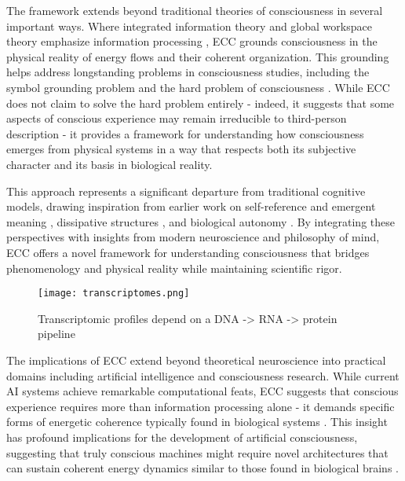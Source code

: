 \begin{refsection}
The framework extends beyond traditional theories of consciousness in several important ways. Where integrated information theory and global workspace theory emphasize information processing \cite{tononi2015consciousness,Baars2019}, ECC grounds consciousness in the physical reality of energy flows and their coherent organization. This grounding helps address longstanding problems in consciousness studies, including the symbol grounding problem and the hard problem of consciousness \cite{harnad1990symbol,chalmers1997conscious}. While ECC does not claim to solve the hard problem entirely - indeed, it suggests that some aspects of conscious experience may remain irreducible to third-person description \cite{nagel1980like,nagel1989view} - it provides a framework for understanding how consciousness emerges from physical systems in a way that respects both its subjective character and its basis in biological reality.

This approach represents a significant departure from traditional cognitive models, drawing inspiration from earlier work on self-reference and emergent meaning \cite{hofstadter1999godel}, dissipative structures \cite{prigogine2018order}, and biological autonomy \cite{bateson2000steps}. By integrating these perspectives with insights from modern neuroscience and philosophy of mind, ECC offers a novel framework for understanding consciousness that bridges phenomenology and physical reality while maintaining scientific rigor.

\begin{figure}[h]
    \centering
    \texttt{[image: transcriptomes.png]}

    \caption{Transcriptomic profiles depend on a DNA -> RNA -> protein pipeline}
\end{figure}

The implications of ECC extend beyond theoretical neuroscience into practical domains including artificial intelligence and consciousness research. While current AI systems achieve remarkable computational feats, ECC suggests that conscious experience requires more than information processing alone - it demands specific forms of energetic coherence typically found in biological systems \cite{thompson2010mind}. This insight has profound implications for the development of artificial consciousness, suggesting that truly conscious machines might require novel architectures that can sustain coherent energy dynamics similar to those found in biological brains \cite{seth2024conscious}.


\end{refsection}
